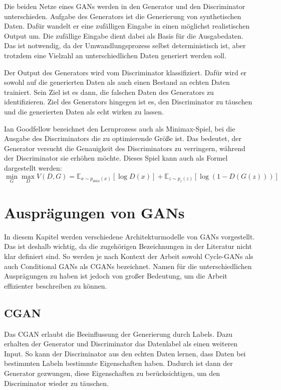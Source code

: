 Die beiden Netze eines \acrshort{GAN}s werden in den Generator und den Discriminator unterschieden.
Aufgabe des Generators ist die Generierung von synthetischen Daten.
Dafür wandelt er eine zufälligen Eingabe in einen möglichst realistischen Output um.
Die zufällige Eingabe dient dabei als Basis für die Ausgabedaten.
Das ist notwendig, da der Umwandlungsprozess selbst deterministisch ist, aber trotzdem eine Vielzahl an unterschiedlichen Daten generiert werden soll.
\newline

Der Output des Generators wird vom Discriminator klassifiziert.
Dafür wird er sowohl auf die generierten Daten als auch einen Bestand an echten Daten trainiert.
Sein Ziel ist es dann, die falschen Daten des Generators zu identifizieren.
Ziel des Generators hingegen ist es, den Discriminator zu täuschen und die generierten Daten als echt wirken zu lassen.
\newline

Ian Goodfellow bezeichnet den Lernprozess auch als Minimax-Spiel, bei die Ausgabe des Discriminators die zu optimierende Größe ist.
Das bedeutet, der Generator versucht die Genauigkeit des Discriminators zu verringern, während der Discriminator sie erhöhen möchte. \cite{gan-minimax}
Dieses Spiel kann auch als Formel \cite[S. 2]{mirza2014conditional} dargestellt werden: 
\begin{equation}
	\min_G \max_D V(D, G) = \mathbb{E}_{x \sim p_{data}(x)} [\log D(x)] + \mathbb{E}_{z \sim p_z(z)} [\log(1 - D(G(z)))]
\end{equation}

\section{Ausprägungen von GANs}
In diesem Kapitel werden verschiedene Architekturmodelle von \acrshort{GAN}s vorgestellt.
Das ist deshalb wichtig, da die zugehörigen Bezeichnungen in der Literatur nicht klar definiert sind.
So werden je nach Kontext der Arbeit sowohl Cycle-GANs als auch Conditional GANs als CGANs bezeichnet.
Namen für die unterschiedlichen Ausprägungen zu haben ist jedoch von großer Bedeutung, um die Arbeit effizienter beschreiben zu können.

\subsection{CGAN}
Das \acrfull{CGAN} \cite{mirza2014conditional, gan-conditional} erlaubt die Beeinflussung der Generierung durch Labels.
Dazu erhalten der Generator und Discriminator das Datenlabel als einen weiteren Input.
So kann der Discriminator aus den echten Daten lernen, dass Daten bei bestimmten Labeln bestimmte Eigenschaften haben.
Dadurch ist dann der Generator gezwungen, diese Eigenschaften zu berücksichtigen, um den Discriminator wieder zu täuschen.
\newline

